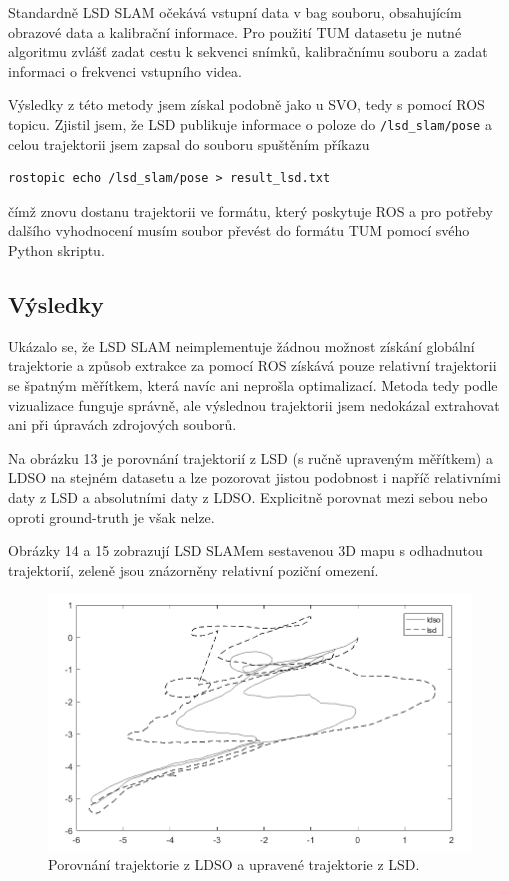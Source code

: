 \documentclass[12pt,a4paper]{report}
\begin{document}
Standardně LSD SLAM očekává vstupní data v bag souboru, obsahujícím obrazové data a kalibrační informace. Pro použití TUM datasetu je nutné algoritmu zvlášť zadat cestu k sekvenci snímků, kalibračnímu souboru a zadat informaci o frekvenci vstupního videa.

Výsledky z této metody jsem získal podobně jako u SVO, tedy s pomocí ROS topicu. Zjistil jsem, že LSD publikuje informace o poloze do \texttt{/lsd\_slam/pose} a celou trajektorii jsem zapsal do souboru spuštěním příkazu
\begin{verbatim}
rostopic echo /lsd_slam/pose > result_lsd.txt
\end{verbatim}
čímž znovu dostanu trajektorii ve formátu, který poskytuje ROS a pro potřeby dalšího vyhodnocení musím soubor převést do formátu TUM pomocí svého Python skriptu.

\subsection*{Výsledky}
Ukázalo se, že LSD SLAM neimplementuje žádnou možnost získání globální trajektorie a způsob extrakce za pomocí ROS získává pouze relativní trajektorii se špatným měřítkem, která navíc ani neprošla optimalizací. Metoda tedy podle vizualizace funguje správně, ale výslednou trajektorii jsem nedokázal extrahovat ani při úpravách zdrojových souborů.

Na obrázku 13 je porovnání trajektorií z LSD (s ručně upraveným měřítkem) a LDSO na stejném datasetu a lze pozorovat jistou podobnost i napříč relativními daty z LSD a absolutními daty z LDSO. Explicitně porovnat mezi sebou nebo oproti ground-truth je však nelze.

Obrázky 14 a 15 zobrazují LSD SLAMem sestavenou 3D mapu s odhadnutou trajektorií, zeleně jsou znázorněny relativní poziční omezení.

\begin{figure}[H]
\centering
\includegraphics[scale=0.63]{img/porov_lsd_ldso.png}
\caption{Porovnání trajektorie z LDSO a upravené trajektorie z LSD.}
\end{figure} 
\end{document}
